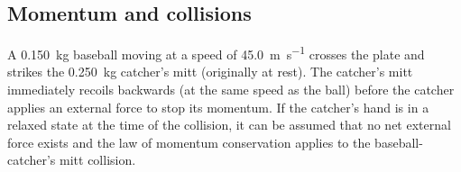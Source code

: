 \documentclass[hw,addpoints,noanswers]{exam}
\begin{document}
\begin{questions}
\clearpage
\section*{Momentum and collisions}
\question
A \SI{0.150}{\kilo\gram} baseball moving at a speed of \SI{45.0}{\meter\per\second} crosses the plate and strikes the \SI{0.250}{\kilo\gram} catcher's mitt (originally at rest). The catcher's mitt immediately recoils backwards (at the same speed as the ball) before the catcher applies an external force to stop its momentum. If the catcher's hand is in a relaxed state at the time of the collision, it can be assumed that no net external force exists and the law of momentum conservation applies to the baseball-catcher's mitt collision. 


\end{questions}
\end{document}
